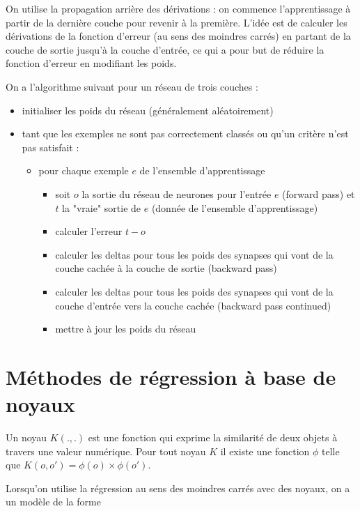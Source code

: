 	On utilise la propagation arrière des dérivations : on commence l'apprentissage à partir de la dernière couche pour revenir à la première. L'idée est de calculer les dérivations de la fonction d'erreur (au sens des moindres carrés) en partant de la couche de sortie jusqu'à la couche d'entrée, ce qui a pour but de réduire la fonction d'erreur en modifiant les poids.
	
	On a l'algorithme suivant pour un réseau de trois couches : %
	
	\begin{itemize}
		\item initialiser les poids du réseau (généralement aléatoirement)
		\item tant que les exemples ne sont pas correctement classés ou qu'un critère n'est pas satisfait :
		
		\begin{itemize}
			\item pour chaque exemple $e$ de l'ensemble d'apprentissage
				\begin{itemize}
					\item soit $o$ la sortie du réseau de neurones pour l'entrée $e$ (forward pass) et $t$ la "vraie" sortie de $e$ (donnée de l'ensemble d'apprentissage)
					\item calculer l'erreur $t - o$
					\item calculer les deltas pour tous les poids des synapses qui vont de la couche cachée à la couche de sortie (backward pass)
					\item calculer les deltas pour tous les poids des synapses qui vont de la couche d'entrée vers la couche cachée (backward pass continued)
					\item mettre à jour les poids du réseau
				\end{itemize}
		\end{itemize}
	\end{itemize}
	
	
\section{Méthodes de régression à base de noyaux}
	
Un noyau $K(., .)$ est une fonction qui exprime la similarité de deux objets à travers une valeur numérique. Pour tout noyau $K$ il existe une fonction $\phi$ telle que $K(o, o') = \phi(o) \times \phi(o')$.

Lorsqu'on utilise la régression au sens des moindres carrés avec des noyaux, on a un modèle de la forme


